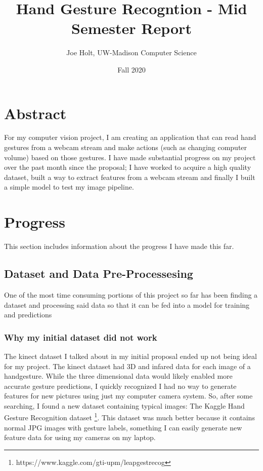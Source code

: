 \documentclass[9pt]{article}
\title{Hand Gesture Recogntion - Mid Semester Report}
\date{Fall 2020}
\author{Joe Holt, UW-Madison Computer Science}
\begin{document}
\maketitle

\section{Abstract}
For my computer vision project, I am creating an application that can read hand gestures from a webcam stream and make actions (such as changing computer volume) based on those gestures. I have made substantial progress on my project over the past month since the proposal; I have worked to acquire a high quality dataset, built a way to extract features from a webcam stream and finally I built a simple model to test my image pipeline.

\section{Progress}
This section includes information about the progress I have made this far. 

\subsection{Dataset and Data Pre-Processesing}

One of the most time consuming portions of this project so far has been finding a dataset and processing said data so that it can be fed into a model for training and predictions

\subsubsection{Why my initial dataset did not work}

The kinect dataset I talked about in my initial proposal ended up not being ideal for my project. The kinect dataset had 3D and infared data for each image of a handgesture. While the three dimensional data would likely enabled more accurate gesture predictions, I quickly recognized I had no way to generate features for new pictures using just my computer camera system. So, after some searching, I found a new dataset containing typical images: The Kaggle Hand Gesture Recognition dataset \footnote{https://www.kaggle.com/gti-upm/leapgestrecog}. This dataset was much better because it contains normal JPG images with gesture labels, something I can easily generate new feature data for using my cameras on my laptop.
\end{document}
